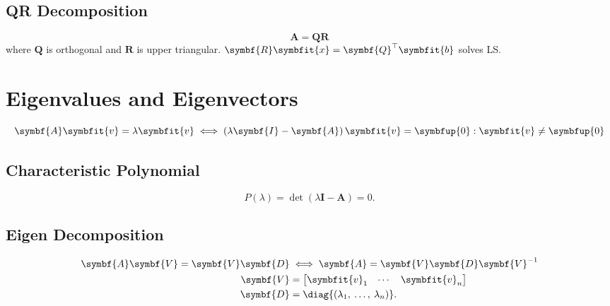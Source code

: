 \documentclass{article}
\begin{document}
\begin{multicols*}{3}
    \subsection{QR Decomposition}
    \begin{equation*}
        \symbf{A} = \symbf{Q} \symbf{R}
    \end{equation*}
    where \(\symbf{Q}\) is orthogonal and \(\symbf{R}\) is upper triangular. \(\symbf{R} \symbfit{x} = \symbf{Q}^\top \symbfit{b}\) solves LS.
    \section{Eigenvalues and Eigenvectors}
    \begin{equation*}
        \symbf{A} \symbfit{v} = \lambda \symbfit{v} \iff \left( \lambda \symbf{I} - \symbf{A} \right) \symbfit{v} = \symbfup{0} : \symbfit{v} \neq \symbfup{0}
    \end{equation*}
    \subsection{Characteristic Polynomial}
    \begin{equation*}
        P\left( \lambda \right) = \det{\left( \lambda \symbf{I} - \symbf{A} \right)} = 0.
    \end{equation*}
    \subsection{Eigen Decomposition}
    \begin{align*}
        \symbf{A} \symbf{V} = \symbf{V} \symbf{D}
                  & \iff
        \symbf{A} = \symbf{V} \symbf{D} \symbf{V}^{-1}                       \\
        \symbf{V} & = \begin{bmatrix}
                          \symbfit{v}_1 & \cdots & \symbfit{v}_n
                      \end{bmatrix}                 \\
        \symbf{D} & = \diag{\left( \lambda_1,\: \dots,\: \lambda_n \right)}.
    \end{align*}

\end{multicols*}
\end{document}
